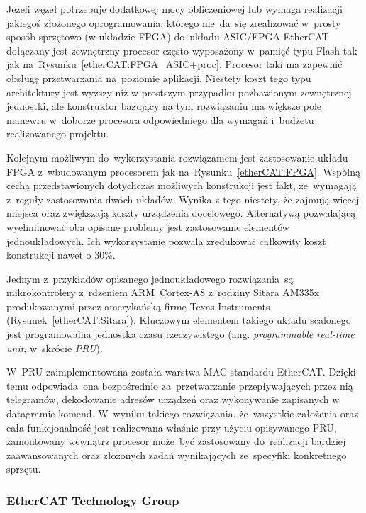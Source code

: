 Jeżeli węzeł potrzebuje dodatkowej mocy obliczeniowej lub wymaga realizacji jakiegoś złożonego oprogramowania, którego nie~da~się zrealizować w~prosty sposób sprzętowo (w układzie FPGA) do~układu ASIC/FPGA EtherCAT dołączany jest zewnętrzny procesor często wyposażony w~pamięć typu Flash tak jak na~Rysunku~\ref{etherCAT:FPGA_ASIC+proc}. Procesor taki ma zapewnić obsługę przetwarzania na~poziomie aplikacji. Niestety koszt tego typu architektury jest wyższy niż w prostszym przypadku pozbawionym zewnętrznej jednostki, ale konstruktor bazujący na tym rozwiązaniu ma większe pole manewru w~doborze procesora odpowiedniego dla wymagań i~budżetu realizowanego projektu.
\clearpage
\vspace{-3mm}

Kolejnym możliwym do~wykorzystania rozwiązaniem jest zastosowanie układu FPGA z~wbudowanym procesorem jak na~Rysunku~\ref{etherCAT:FPGA}. Wspólną cechą przedstawionych dotychczas możliwych konstrukcji jest fakt, że~wymagają z~reguły zastosowania dwóch układów. Wynika z tego niestety, że zajmują więcej miejsca oraz zwiększają koszty urządzenia docelowego. Alternatywą pozwalającą wyeliminować oba opisane problemy jest zastosowanie elementów jednoukładowych. Ich wykorzystanie pozwala zredukować całkowity koszt konstrukcji nawet o 30\%.
\vspace{-3mm}

Jednym z~przykładów opisanego jednoukładowego rozwiązania~są mikrokontrolery z~rdzeniem ARM~Cortex-A8 z~rodziny Sitara AM335x produkowanymi przez amerykańską firmę Texas Instruments (Rysunek~\ref{etherCAT:Sitara}). Kluczowym elementem takiego układu scalonego jest programowalna jednostka czasu rzeczywistego (ang. \textit{programmable real-time unit}, w~skrócie \textit{PRU}). 

W~PRU zaimplementowana została warstwa MAC standardu EtherCAT. Dzięki temu odpowiada~ona bezpośrednio za~przetwarzanie przepływających przez nią telegramów, dekodowanie adresów urządzeń oraz wykonywanie zapisanych w datagramie komend. W~wyniku takiego rozwiązania, że~wszystkie założenia oraz cała funkcjonalność jest realizowana właśnie przy użyciu opisywanego PRU, zamontowany wewnątrz procesor może~być zastosowany do~realizacji bardziej zaawansowanych oraz złożonych zadań wynikających ze~specyfiki konkretnego sprzętu.

\subsubsection{EtherCAT Technology Group}

